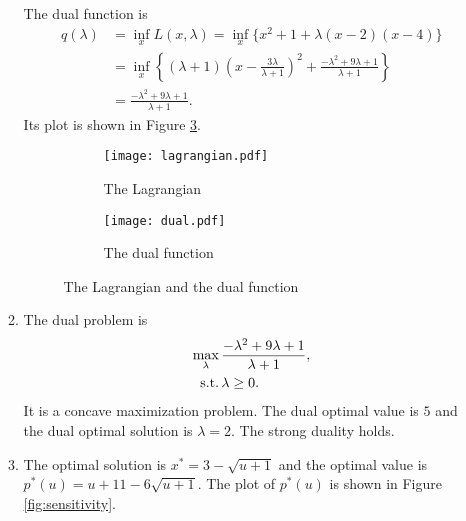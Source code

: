 \begin{exercise}
\begin{enumerate}
\begin{solution}
\begin{enumerate}
                        The dual function is
                        \begin{align*}
                            q(\lambda) & = \inf_x L(x, \lambda) = \inf_x \{x^2+1+\lambda(x-2)(x-4)\}                                                                      \\
                                       & = \inf_x \left\{ (\lambda+1) \left(x - \frac{3\lambda}{\lambda+1}\right)^2 + \frac{-\lambda^2 + 9\lambda + 1}{\lambda+1}\right\} \\
                                       & = \frac{-\lambda^2 + 9\lambda + 1}{\lambda+1}.
                        \end{align*}
                        Its plot is shown in Figure \ref{fig:dual}.

                        \begin{figure}[H]
                            \centering
                            \begin{subfigure}[b]{0.45\textwidth}
                                \centering
                                \texttt{[image: lagrangian.pdf]}
                                \caption{The Lagrangian}
                                \label{fig:lagrangian}
                            \end{subfigure}
                            \begin{subfigure}[b]{0.45\textwidth}
                                \centering
                                \texttt{[image: dual.pdf]}
                                \caption{The dual function}
                                \label{fig:dual}
                            \end{subfigure}
                            \caption{The Lagrangian and the dual function}
                        \end{figure}
                    \item The dual problem is
                        \begin{align*}
                            \max_{\lambda}\, & \frac{-\lambda^2 + 9\lambda + 1}{\lambda+1}, \\
                            {\rm s.t.}\,     & \lambda\ge 0.
                        \end{align*}
                        It is a concave maximization problem. The dual optimal value is $5$ and the dual optimal solution is $\lambda = 2$. The strong duality holds.
                    \item The optimal solution is $x^*=3 - \sqrt{u+1}$ and the optimal value is $p^*(u) = u + 11 - 6\sqrt{u+1}$. The plot of $p^*(u)$ is shown in Figure \ref{fig:sensitivity}.

\end{enumerate}
\end{solution}
\end{enumerate}
\end{exercise}
